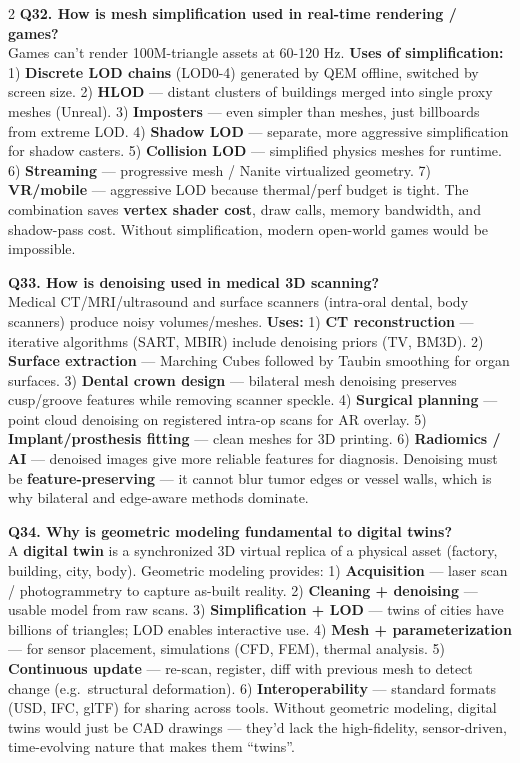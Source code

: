 \begin{paracol}{2}
\textbf{Q32. How is mesh simplification used in real-time rendering / games?}\\
Games can't render 100M-triangle assets at 60-120 Hz. \textbf{Uses of simplification:} 1) \textbf{Discrete LOD chains} (LOD0-4) generated by QEM offline, switched by screen size. 2) \textbf{HLOD} — distant clusters of buildings merged into single proxy meshes (Unreal). 3) \textbf{Imposters} — even simpler than meshes, just billboards from extreme LOD. 4) \textbf{Shadow LOD} — separate, more aggressive simplification for shadow casters. 5) \textbf{Collision LOD} — simplified physics meshes for runtime. 6) \textbf{Streaming} — progressive mesh / Nanite virtualized geometry. 7) \textbf{VR/mobile} — aggressive LOD because thermal/perf budget is tight. The combination saves \textbf{vertex shader cost}, draw calls, memory bandwidth, and shadow-pass cost. Without simplification, modern open-world games would be impossible.

\textbf{Q33. How is denoising used in medical 3D scanning?}\\
Medical CT/MRI/ultrasound and surface scanners (intra-oral dental, body scanners) produce noisy volumes/meshes. \textbf{Uses:} 1) \textbf{CT reconstruction} — iterative algorithms (SART, MBIR) include denoising priors (TV, BM3D). 2) \textbf{Surface extraction} — Marching Cubes followed by Taubin smoothing for organ surfaces. 3) \textbf{Dental crown design} — bilateral mesh denoising preserves cusp/groove features while removing scanner speckle. 4) \textbf{Surgical planning} — point cloud denoising on registered intra-op scans for AR overlay. 5) \textbf{Implant/prosthesis fitting} — clean meshes for 3D printing. 6) \textbf{Radiomics / AI} — denoised images give more reliable features for diagnosis. Denoising must be \textbf{feature-preserving} — it cannot blur tumor edges or vessel walls, which is why bilateral and edge-aware methods dominate.

\textbf{Q34. Why is geometric modeling fundamental to digital twins?}\\
A \textbf{digital twin} is a synchronized 3D virtual replica of a physical asset (factory, building, city, body). Geometric modeling provides: 1) \textbf{Acquisition} — laser scan / photogrammetry to capture as-built reality. 2) \textbf{Cleaning + denoising} — usable model from raw scans. 3) \textbf{Simplification + LOD} — twins of cities have billions of triangles; LOD enables interactive use. 4) \textbf{Mesh + parameterization} — for sensor placement, simulations (CFD, FEM), thermal analysis. 5) \textbf{Continuous update} — re-scan, register, diff with previous mesh to detect change (e.g.\ structural deformation). 6) \textbf{Interoperability} — standard formats (USD, IFC, glTF) for sharing across tools. Without geometric modeling, digital twins would just be CAD drawings — they'd lack the high-fidelity, sensor-driven, time-evolving nature that makes them ``twins''.


\end{paracol}
